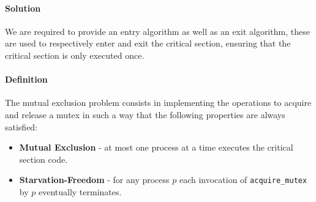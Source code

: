 \paragraph{Solution}
We are required to provide an entry algorithm as well as an exit algorithm,
these are used to respectively enter and exit the critical section,
ensuring that the critical section is only executed once.

\paragraph{Definition}
The mutual exclusion problem consists in implementing the operations to acquire and release a mutex
in such a way that the following properties are always satisfied:

\begin{itemize}
    \item \textbf{Mutual Exclusion} - at most one process at a time executes the critical section code.
    \item \textbf{Starvation-Freedom} - for any process $p$ each invocation of \texttt{acquire\_mutex} by $p$ eventually terminates.
\end{itemize}
